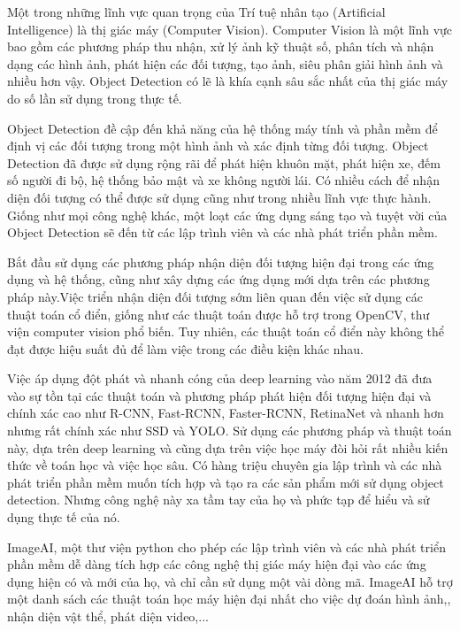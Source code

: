 \documentclass[14pt,oneside,a4paper]{extreport}
\begin{document}
Một trong những lĩnh vực quan trọng của Trí tuệ nhân tạo (Artificial Intelligence) là thị giác máy (Computer Vision). Computer Vision là một lĩnh vực bao gồm các phương pháp thu nhận, xử lý ảnh kỹ thuật số, phân tích và nhận dạng các hình ảnh, phát hiện các đối tượng, tạo ảnh, siêu phân giải hình ảnh và nhiều hơn vậy. Object Detection có lẽ là khía cạnh sâu sắc nhất của thị giác máy do số lần sử dụng trong thực tế.

Object Detection đề cập đến khả năng của hệ thống máy tính và phần mềm để định vị các đối tượng trong một hình ảnh và xác định từng đối tượng. Object Detection đã được sử dụng rộng rãi để phát hiện khuôn mặt, phát hiện xe, đếm số người đi bộ, hệ thống bảo mật và xe không người lái. Có nhiều cách để nhận diện đối tượng có thể được sử dụng cũng như trong nhiều lĩnh vực thực hành. Giống như mọi công nghệ khác, một loạt các ứng dụng sáng tạo và tuyệt vời của Object Detection sẽ đến từ các lập trình viên và các nhà phát triển phần mềm.

Bắt đầu sử dụng các phương pháp nhận diện đối tượng hiện đại trong các ứng dụng và hệ thống, cũng như xây dựng các ứng dụng mới dựa trên các phương pháp này.Việc triển nhận diện đối tượng sớm liên quan đến việc sử dụng các thuật toán cổ điển, giống như các thuật toán được hỗ trợ trong OpenCV, thư viện computer vision phổ biến. Tuy nhiên, các thuật toán cổ điển này không thể đạt được hiệu suất đủ để làm việc trong các điều kiện khác nhau.

Việc áp dụng đột phát và nhanh cóng của deep learning vào năm 2012 đã đưa vào sự tồn tại các thuật toán và phương pháp phát hiện đối tượng hiện đại và chính xác cao như R-CNN, Fast-RCNN, Faster-RCNN, RetinaNet và nhanh hơn nhưng rất chính xác như SSD và YOLO. Sử dụng các phương pháp và thuật toán này, dựa trên deep learning và cũng dựa trên việc học máy đòi hỏi rất nhiều kiến thức về toán học và việc học sâu. Có hàng triệu chuyên gia lập trình và các nhà phát triển phần mềm muốn tích hợp và tạo ra các sản phẩm mới sử dụng object detection. Nhưng công nghệ này xa tầm tay của họ và phức tạp để hiểu và sử dụng thực tế của nó.

ImageAI, một thư viện python cho phép các lập trình viên và các nhà phát triển phần mềm dễ dàng tích hợp các công nghệ thị giác máy hiện đại vào các ứng dụng hiện có và mới của họ, và chỉ cần sử dụng một vài dòng mã. ImageAI hỗ trợ một danh sách các thuật toán học máy hiện đại nhất cho việc dự đoán hình ảnh,, nhận diện vật thể, phát diện video,...
\end{document}
